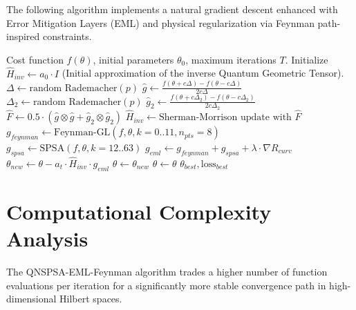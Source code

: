 \documentclass[11pt,a4paper,spanish]{book}
\numberwithin{equation}{chapter}
\numberwithin{figure}{chapter}
\numberwithin{equation}{chapter}
\numberwithin{figure}{chapter}
\numberwithin{table}{chapter}
\begin{document}
The following algorithm implements a natural gradient descent enhanced with Error Mitigation Layers (EML) and physical regularization via Feynman path-inspired constraints.

\begin{algorithm}
\caption{QNSPSA-EML-Feynman Optimizer}
\begin{algorithmic}[1]
\REQUIRE Cost function $f(\theta)$, initial parameters $\theta_0$, maximum iterations $T$.
\STATE Initialize $\hat{H}_{inv} \gets a_0 \cdot I$ (Initial approximation of the inverse Quantum Geometric Tensor).
  \STATE {}
  \STATE $\Delta \gets \text{random Rademacher}(p)$
  \STATE $\hat{g} \gets \frac{f(\theta + c \Delta) - f(\theta - c \Delta)}{2c\Delta}$
  \STATE {}
  \STATE $\Delta_2 \gets \text{random Rademacher}(p)$
  \STATE $\hat{g}_2 \gets \frac{f(\theta + c \Delta_2) - f(\theta - c \Delta_2)}{2c\Delta_2}$
  \STATE $\hat{F} \gets 0.5 \cdot (\hat{g} \otimes \hat{g} + \hat{g}_2 \otimes \hat{g}_2)$ 
  \STATE $\hat{H}_{inv} \gets \text{Sherman-Morrison update with } \hat{F}$
  \STATE {}
  \STATE $g_{feynman} \gets \text{Feynman-GL}(f, \theta, k=0..11, n_{pts}=8)$
  \STATE $g_{spsa} \gets \text{SPSA}(f, \theta, k=12..63)$
  \STATE $g_{eml} \gets g_{feynman} + g_{spsa} + \lambda \cdot \nabla R_{curv}$ 
  \STATE {}
  \STATE $\theta_{new} \gets \theta - a_t \cdot \hat{H}_{inv} \cdot g_{eml}$
  \STATE {}
    \STATE $\theta \gets \theta_{new}$
  \ELSE
    \STATE $\theta \gets \theta$ 
  \ENDIF
\ENDFOR
\RETURN $\theta_{best}, \text{loss}_{best}$
\end{algorithmic}
\end{algorithm}

\section{Computational Complexity Analysis}

The QNSPSA-EML-Feynman algorithm trades a higher number of function evaluations per iteration for a significantly more stable convergence path in high-dimensional Hilbert spaces.
\end{document}
